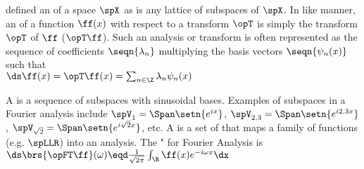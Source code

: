 defined an  of a space $\spX$ as is any lattice of subspaces of $\spX$.
In like manner, an  of a function $\ff(x)$ with respect to a transform $\opT$ 
is simply the transform $\opT$ of $\ff$ ($\opT\ff$).
Such an analysis or transform is often represented as the sequence of coefficients $\seqn{\lambda_n}$
multiplying the basis vectors $\seqn{\psi_n(x)}$ such that
\\\indentx$\ds\ff(x) = \opT\ff(x) = \sum_{n\in\Z} \lambda_n\psi_n(x)$

\begin{example}
A  is a sequence of subspaces with sinusoidal bases.
  Examples of subspaces in a Fourier analysis include $\spV_1=\Span\setn{e^{ix}}$, 
  $\spV_{2.3}=\Span\setn{e^{i2.3x}}$, $\spV_{\sqrt{2}}=\Span\setn{e^{i\sqrt{2}x}}$, etc.
  A  is a set of  that maps a family of functions (e.g. $\spLLR$)
  into an analysis.
  The " for Fourier Analysis is 
  \\\indentx$\ds\brs{\opFT\ff}(\omega) \eqd \frac{1}{\sqrt{2\pi}} \int_\R \ff(x) e^{-i\omega x} \dx$
\end{example}



